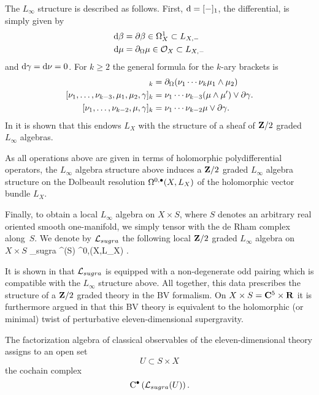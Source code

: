 \documentclass[11pt]{amsart}
\begin{document}
The $L_\infty$ structure is described as follows. 
First, ${\rm d} = [-]_1$, the differential, is simply given by 
\begin{align*}
{\rm d} \beta & = \partial \beta \in \Omega^1_X \subset L_{X,-} \\
{\rm d} \mu & = \partial_{\Omega} \mu \in \mathcal O_X \subset L_{X, -}
\end{align*}
and ${\rm d} \gamma = {\rm d} \nu = 0$. 
For $k \geq 2$ the general formula for the $k$-ary brackets is 
\begin{align*}
[\nu_1, \ldots, \nu_{k-2}, \mu_1,\mu_2]_{k} & = \div(\nu_1 \cdots \nu_k \mu_1 \wedge \mu_2) \\
[\nu_1,\ldots, \nu_{k-3}, \mu_1,\mu_2,\gamma]_k & = \nu_1 \cdots \nu_{k-3} (\mu \wedge \mu') \vee \del \gamma .\\
[\nu_1,\ldots,\nu_{k-2}, \mu, \gamma]_k & = \nu_1 \cdots \nu_{k-2} \mu \vee \del \gamma .
\end{align*}
In \cite{RSW} it is shown that this endows $L_{X}$ with the structure of a sheaf of $\mathbf{Z}/2$ graded $L_\infty$ algebras.

As all operations above are given in terms of holomorphic polydifferential operators, the $L_\infty$ algebra structure above induces a $\mathbf{Z}/2$ graded $L_\infty$ algebra structure on the Dolbeault resolution $\Omega^{0,\bullet}(X,L_X)$ of the holomorphic vector bundle $L_X$.

Finally, to obtain a local $L_\infty$ algebra on $X \times S$, where $S$ denotes an arbitrary real oriented smooth one-manifold, we simply tensor with the de Rham complex along~$S$.
We denote by $\mathcal L_{sugra}$ the following local $\mathbf{Z}/2$ graded $L_\infty$ algebra on $X \times S$
\beqn
\cL_{sugra}  \Omega^\bu(S) \hotimes \Omega^{0,\bu}(X,L_X) .
\eeqn

\parsec[s:rsw]
It is shown in \cite{RSW} that $\mathcal L_{sugra}$ is equipped with a non-degenerate odd pairing which is compatible with the $L_\infty$ structure above. 
All together, this data prescribes the structure of a $\mathbf{Z}/2$ graded theory in the BV formalism. 
On $X \times S = \mathbf{C}^5 \times \mathbf{R}$ it is furthermore argued in \cite{RSW} that this BV theory is equivalent to the holomorphic (or minimal) twist of perturbative eleven-dimensional supergravity. 

\parsec[s:sugraobs]

The factorization algebra of classical observables of the eleven-dimensional theory assigns to an open set 
\[
U \subset S \times X 
\]
the cochain complex
\[
{\rm C}^\bullet\left(\mathcal L_{sugra}(U)\right) .
\]
\end{document}
